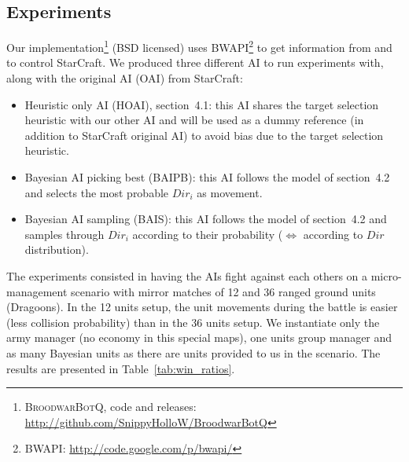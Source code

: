\subsection{Experiments}

Our implementation\footnote{\textsc{BroodwarBotQ}, code and releases: \url{http://github.com/SnippyHolloW/BroodwarBotQ}} (BSD licensed) uses BWAPI\footnote{BWAPI: \url{http://code.google.com/p/bwapi/}} to get information from and to control StarCraft. 
We produced three different AI to run experiments with, along with the original AI (OAI) from StarCraft:
\begin{itemize}
\item Heuristic only AI (HOAI), section~4.1: this AI shares the target selection heuristic with our other AI and will be used as a dummy reference (in addition to StarCraft original AI) to avoid bias due to the target selection heuristic.
\item Bayesian AI picking best (BAIPB): this AI follows the model of section~4.2 and selects the most probable $Dir_i$ as movement. 
\item Bayesian AI sampling (BAIS): this AI follows the model of section~4.2 and samples through $Dir_i$ according to their probability ($\Leftrightarrow$ according to $Dir$ distribution).
\end{itemize}

The experiments consisted in having the AIs fight against each others on a micro-management scenario with mirror matches of 12 and 36 ranged ground units (Dragoons). In the 12 units setup, the unit movements during the battle is easier (less collision probability) than in the 36 units setup. We instantiate only the army manager (no economy in this special maps), one units group manager and as many Bayesian units as there are units provided to us in the scenario. The results are presented in Table~\ref{tab:win_ratios}.

